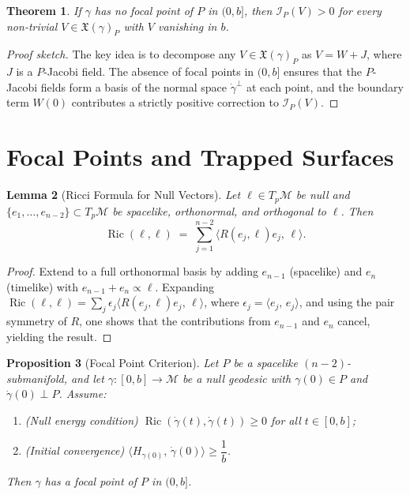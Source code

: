 \documentclass[12pt, a4paper]{article}
\theoremstyle{plain}
\newtheorem{theorem}{Theorem}[section]
\newtheorem{proposition}[theorem]{Proposition}
\newtheorem{lemma}[theorem]{Lemma}
\theoremstyle{definition}
\theoremstyle{remark}
\newcommand{\M}{\mathcal{M}}
\newcommand{\Ric}{\operatorname{Ric}}
\newcommand{\Ind}{\mathcal{I}}
\newcommand{\ls}[2]{\langle #1,\, #2 \rangle}
\begin{document}
\begin{theorem}
\label{thm:index-positive}
  If $\gamma$ has no focal point of $P$ in $(0, b]$, then
  $\Ind_P(V) > 0$ for every non-trivial $V \in \mathfrak{X}(\gamma)_P$ with $V$ vanishing in $b$.
\end{theorem}

\begin{proof}[Proof sketch]
  The key idea is to decompose any $V \in \mathfrak{X}(\gamma)_P$ as $V = W + J$,
  where $J$ is a $P$-Jacobi field. The absence of focal points in $(0, b]$ ensures that the
  $P$-Jacobi fields form a basis of the normal space $\dot{\gamma}^\perp$
  at each point, and the boundary term $W(0)$ contributes a strictly
  positive correction to $\Ind_P(V)$.
\end{proof}


\section{Focal Points and Trapped Surfaces}

\begin{lemma}[Ricci Formula for Null Vectors]
\label{lem:ricci-null}
  Let $\ell \in T_p\M$ be null and $\{e_1,\ldots,e_{n-2}\} \subset
  T_p\M$ be spacelike, orthonormal, and orthogonal to $\ell$. Then
  \[
    \Ric(\ell,\ell)
    \;=\; \sum_{j=1}^{n-2} \ls{R(e_j,\ell)e_j}{\ell}.
  \]
\end{lemma}

\begin{proof}
  Extend to a full orthonormal basis by adding $e_{n-1}$ (spacelike) and $e_n$
  (timelike) with $e_{n-1} + e_n \propto \ell$. Expanding
  $\Ric(\ell,\ell) = \sum_j \epsilon_j \ls{R(e_j,\ell)e_j}{\ell}$,
  where $\epsilon_j = \ls{e_j}{e_j}$, and using the pair symmetry of $R$,
  one shows that the contributions from $e_{n-1}$ and $e_n$ cancel,
  yielding the result.
\end{proof}

\begin{proposition}[Focal Point Criterion]
\label{prop:focal-point}
  Let $P$ be a spacelike $(n-2)$-submanifold, and let
  $\gamma \colon [0,b] \to \M$ be a null geodesic with $\gamma(0) \in P$ and
  $\dot{\gamma}(0) \perp P$. Assume:
  \begin{enumerate}
    \item \emph{(Null energy condition)} $\Ric(\dot{\gamma}(t), \dot{\gamma}(t)) \geq 0$
          for all $t \in [0,b]$;
    \item \emph{(Initial convergence)} $\ls{H_{\gamma(0)}}{\dot{\gamma}(0)}
          \geq \dfrac{1}{b}$.
  \end{enumerate}
  Then $\gamma$ has a focal point of $P$ in $(0, b]$.
\end{proposition}
\end{document}
